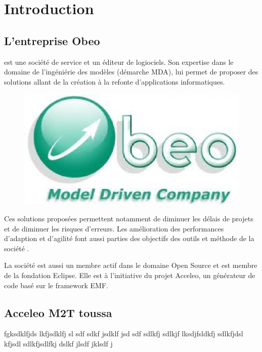 \chapter{Introduction}\label{chap:Intro}

\section{L'entreprise Obeo}
\obeo{} est une société de service et un éditeur de logiociels. Son expertise dans le domaine de l'ingéniérie des modèles (démarche MDA), lui permet de proposer des solutions allant de la création à la refonte d'applications informatiques. 


\begin{figure}[htb]
  \centering
  \includegraphics[scale=.4]{img/logoobeo.eps}
  \label{fig:obeo}
\end{figure}

Ces solutions proposées permettent notamment de diminuer les délais de projets et de diminuer les risques d'erreurs. Les amélioration des performances d'adaption et d'agilité font aussi parties des objectifs des outils et méthode de la société \obeo{}.




La société \obeo{} est aussi un membre actif dans le domaine Open Source et est membre de la fondation Eclipse. Elle est à l'initiative du projet Acceleo, un générateur de code basé sur le framework EMF. 


\section{Acceleo M2T toussa}
fgksdklfjds lkfjsdklfj sl sdf sdkf jsdklf jsd sdf sdlkfj sdlkjf lksdjfsldkfj sdlkfjdsl kfjsdl 
sdlkfjsdlfkj dslkf jlsdf jklsdf j
